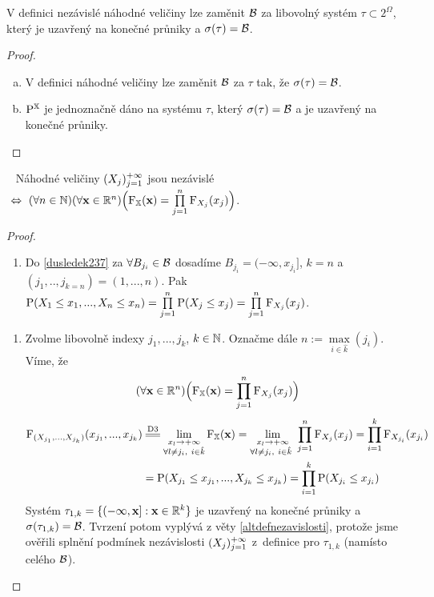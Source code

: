 \begin{theorem}\label{altdefnezavislosti}
	V definici nezávislé náhodné veličiny lze zaměnit $\mathcal{B}$ za libovolný systém $\tau \subset 2^\Omega$, který je uzavřený na konečné průniky a $\sigma(\tau)=\mathcal{B}$.
	\begin{proof}
		\begin{enumerate}[a)]
			\item V definici náhodné veličiny lze zaměnit $\mathcal{B}$ za $\tau$ tak, že $\sigma(\tau)=\mathcal{B}$.
			\item $\mathrm{P}^{\mathbb{X}}$ je jednoznačně dáno na systému $\tau$, který $\sigma(\tau)=\mathcal{B}$ a je uzavřený na konečné průniky.
		\end{enumerate}
	\end{proof}
\end{theorem}
\begin{dusl} ~ \newline
	Náhodné veličiny	$(X_j)_{j=1}^{+\infty}$  jsou nezávislé $~\Leftrightarrow~ (\forall n \in \mathbb{N})(\forall \textbf{x}\in \mathbb{R}^n)\Bigl(\mathrm{F}_{\mathbb{X}}(\textbf{x})=\prod\limits_{j=1}^n \mathrm{F}_{X_j}(x_j)\Bigr)$.
	\begin{proof}
		\begin{enumerate}[$\Rightarrow$:]
			\item Do \ref{dusledek237} za $\forall B_{j_i} \in \mathcal{B}$ dosadíme $B_{j_i}=(-\infty,x_{j_i}]$, $k=n$ a $(j_1,..,j_{k=n})=(1,...,n)$. Pak~~$\mathrm{P}(X_1 \leq x_1,...,X_n \leq x_n)= \prod\limits_{j=1}^n \mathrm{P}(X_j \leq x_j)= \prod\limits_{j=1}^n \mathrm{F}_{X_j}(x_j)$.
		\end{enumerate}
		\begin{enumerate}[$\Leftarrow$:]
		\item Zvolme libovolně indexy $j_1,...,j_k$, $k \in \mathbb{N}$. Označme dále $n:=\max\limits_{i\in\hat{k}}(j_i)$. Víme, že 
		$$ (\forall \textbf{x}\in \mathbb{R}^n)\Bigl(\mathrm{F}_{\mathbb{X}}(\textbf{x})=\prod\limits_{j=1}^n \mathrm{F}_{X_j}(x_j)\Bigr) $$
		\[
		\begin{split}
		 \FF_{(X_{j_1},...,X_{j_k})}(x_{j_1},...,x_{j_k}) &\equal{\text{D3}}\lim\limits_{\substack{x_l\to+\infty \\ \forall l \neq j_i,~i\in\hat{k}}} \FEX(\textbf{x})=\lim\limits_{\substack{x_l\to+\infty \\ \forall l \neq j_i,~i\in\hat{k}~}} \prod\limits_{j=1}^n \FF_{X_j}(x_j)=\prod\limits_{i=1}^k \FF_{X_{j_i}}(x_{j_i})\\
	 &= \PP(X_{j_1}\leq x_{j_1},...,X_{j_k}\leq x_{j_k})=\prod\limits_{i=1}^k \PP(X_{j_i}\leq x_{j_i})
		\end{split}
		\]
		Systém $\tau_{1,k}=\{ ( -\infty,\textbf{x}]: \textbf{x}\in\mathbb{R}^k \}$ je uzavřený na konečné průniky a $\sigma(\tau_{1,k})=\mathcal{B}$. Tvrzení potom vyplývá z věty \ref{altdefnezavislosti}, protože jsme ověřili splnění podmínek nezávislosti $(X_j)_{j=1}^{+\infty}$ z~definice pro $\tau_{1,k}$ (namísto celého $\mathcal{B}$).
	\end{enumerate}
	\end{proof}
\end{dusl}
